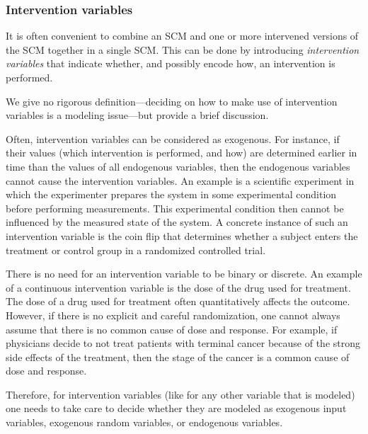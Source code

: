\subsubsection{Intervention variables}

It is often convenient to combine an SCM and one or more intervened versions of the SCM together in a single SCM.
This can be done by introducing \emph{intervention variables} that indicate whether, and possibly encode how, an intervention is performed.

We give no rigorous definition---deciding on how to make use of intervention variables is a modeling issue---but provide a brief discussion.

Often, intervention variables can be considered as exogenous. 
For instance, if their values (which intervention is performed, and how) are determined earlier in time than the values of all endogenous variables, then the endogenous variables cannot cause the intervention variables. 
An example is a scientific experiment in which the experimenter prepares the system in some experimental condition before performing measurements. 
This experimental condition then cannot be influenced by the measured state of the system.  
A concrete instance of such an intervention variable is the coin flip that determines whether a subject enters the treatment or control group in a randomized controlled trial.  

There is no need for an intervention variable to be binary or discrete.
An example of a continuous intervention variable is the dose of the drug used for treatment.
The dose of a drug used for treatment often quantitatively affects the outcome. 
However, if there is no explicit and careful randomization, one cannot always assume that there is no common cause of dose and response. 
For example, if physicians decide to not treat patients with terminal cancer because of the strong side effects of the treatment, then the stage of the cancer is a common cause of dose and response.

Therefore, for intervention variables (like for any other variable that is modeled) one needs to take care to decide whether they
are modeled as exogenous input variables, exogenous random variables, or endogenous variables.

